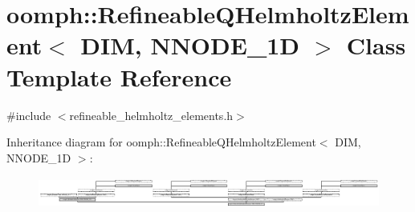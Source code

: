 \hypertarget{classoomph_1_1RefineableQHelmholtzElement}{}\section{oomph\+:\+:Refineable\+Q\+Helmholtz\+Element$<$ D\+IM, N\+N\+O\+D\+E\+\_\+1D $>$ Class Template Reference}
\label{classoomph_1_1RefineableQHelmholtzElement}


{\ttfamily \#include $<$refineable\+\_\+helmholtz\+\_\+elements.\+h$>$}

Inheritance diagram for oomph\+:\+:Refineable\+Q\+Helmholtz\+Element$<$ D\+IM, N\+N\+O\+D\+E\+\_\+1D $>$\+:\begin{figure}[H]
\begin{center}
\leavevmode
\includegraphics[height=1.051643cm]{classoomph_1_1RefineableQHelmholtzElement}
\end{center}
\end{figure}
